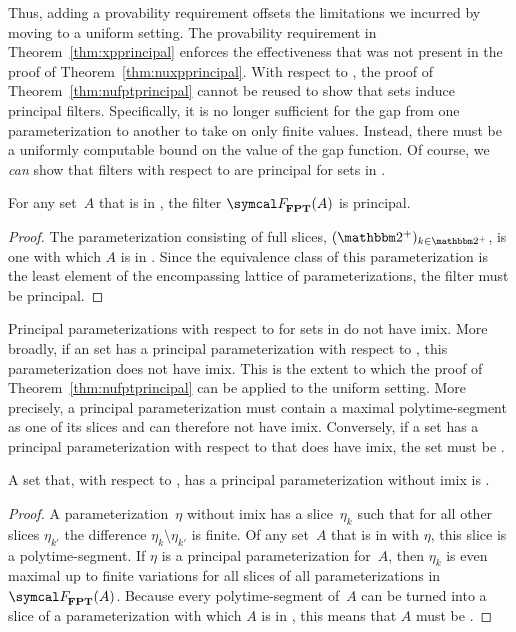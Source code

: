 Thus, adding a provability requirement offsets the limitations we incurred by moving to a uniform setting.
The provability requirement in Theorem~\ref{thm:xpprincipal} enforces the effectiveness that was not present in the proof of Theorem~\ref{thm:nuxpprincipal}.
With respect to , the proof of Theorem~\ref{thm:nufptprincipal} cannot be reused to show that  sets induce principal filters.
Specifically, it is no longer sufficient for the gap from one parameterization to another to take on only finite values.
Instead, there must be a uniformly computable bound on the value of the gap function.
Of course, we \emph{can} show that filters with respect to  are principal for sets in .
\begin{theorem}
\label{thm:fptprincipal}%
  For any set~$A$ that is in , the filter $\calF_\cl{FPT}(A)$ is principal.
\end{theorem}
\begin{proof}
  The parameterization consisting of full slices, $(\binary^+)_{k \in \binary^+}$, is one with which $A$ is in .
  Since the equivalence class of this parameterization is the least element of the encompassing lattice of parameterizations, the filter must be principal.
\end{proof}

%
%
Principal parameterizations with respect to  for sets in  do not have imix.
More broadly, if an  set has a principal parameterization with respect to , this parameterization does not have imix.
This is the extent to which the proof of Theorem~\ref{thm:nufptprincipal} can be applied to the uniform setting.
More precisely, a principal parameterization must contain a maximal polytime-segment as one of its slices and can therefore not have imix.
Conversely, if a set has a principal parameterization with respect to  that does have imix, the set must be .
\begin{lemma}
\label{lem:fptimix}%
  A set that, with respect to , has a principal parameterization without imix is .
\end{lemma}
\begin{proof}
  A parameterization~$\eta$ without imix has a slice~$\eta_k$ such that for all other slices $\eta_{k'}$ the difference $\eta_k \setminus \eta_{k'}$ is finite.
  Of any set~$A$ that is in  with $\eta$, this slice is a polytime-segment.
  If $\eta$ is a principal parameterization for~$A$, then $\eta_k$ is even maximal up to finite variations for all slices of all parameterizations in~$\calF_\cl{FPT}(A)$.
  Because every polytime-segment of~$A$ can be turned into a slice of a parameterization with which $A$ is in , this means that $A$ must be .
\end{proof}
%

